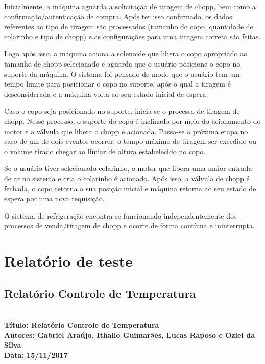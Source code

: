 Inicialmente, a máquina aguarda a solicitação de tiragem de chopp, bem como a confirmação/autenticação de compra. 
Após ter isso confirmado, os dados referentes ao tipo de tiragem são processados (tamanho do copo, quantidade de colarinho
e tipo de chopp) e as configurações para uma tiragem correta são feitas.

Logo após isso, a máquina aciona a solenoide que libera o copo apropriado ao tamanho de chopp selecionado e aguarda que o 
usuário  posicione o copo no suporte da máquina. O  sistema foi pensado de modo que o usuário tem um tempo limite para
posicionar o copo no suporte, após o qual a tiragem é desconsiderada e a máquina volta ao seu estado inicial de espera.

Caso o copo seja posicionado no suporte, inicia-se o processo de tiragem de chopp. Nesse processo, o suporte do copo é
inclinado por meio do acionamento do motor e a válvula que libera o chopp é acionada. Passa-se a próxima etapa no caso de um
de dois eventos ocorrer: o tempo máximo de tiragem ser excedido ou o 
volume tirado chegar ao limiar de altura estabelecido no copo.

Se o usuário tiver selecionado colarinho, o motor que libera uma maior entrada de ar no sistema e cria o colarinho é 
acionado. Após isso, a válvula de chopp é fechada, o copo retorna a sua 
posição inicial e máquina retorna ao seu estado de espera por uma nova requisição.

O sistema de refrigeração encontra-se funcionando independentemente dos processos de venda/tiragem de chopp e ocorre de forma
contínua e ininterrupta.





\section{Relatório de teste}

\subsection{Relatório Controle de Temperatura}
\textbf{ \\
  Título: Relatório Controle de Temperatura  \\
    Autores: Gabriel Araújo, Ithallo Guimarães, Lucas Raposo e Oziel da Silva\\
      Data: 15/11/2017} \\



